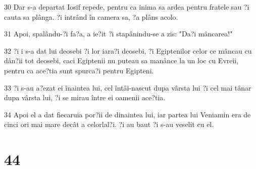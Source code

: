 \par 30 Dar s-a departat Iosif repede, pentru ca inima sa ardea pentru fratele sau ?i cauta sa plânga. ?i intrând în camera sa, ?a plâns acolo.
\par 31 Apoi, spalându-?i fa?a, a ie?it ?i stapânindu-se a zis: "Da?i mâncarea!"
\par 32 ?i i s-a dat lui deosebi ?i lor iara?i deosebi, ?i Egiptenilor celor ce mâncau cu dân?ii tot deosebi, caci Egiptenii nu puteau sa manânce la un loc cu Evreii, pentru ca ace?tia sunt spurca?i pentru Egipteni.
\par 33 ?i s-au a?ezat ei înaintea lui, cel întâi-nascut dupa vârsta lui ?i cel mai tânar dupa vârsta lui, ?i se mirau între ei oamenii ace?tia.
\par 34 Apoi el a dat fiecaruia por?ii de dinaintea lui, iar partea lui Veniamin era de cinci ori mai mare decât a celorlal?i. ?i au baut ?i s-au veselit cu el.

\chapter{44}

